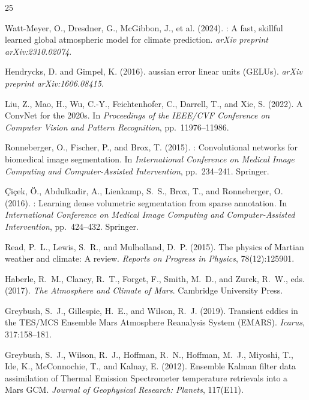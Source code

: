 \documentclass[11pt, a4paper, twocolumn]{article}
\begin{document}
\begin{thebibliography}{25}

Watt-Meyer, O., Dresdner, G., McGibbon, J., et al. (2024).
: A fast, skillful learned global atmospheric model for climate prediction.
\newblock \textit{arXiv preprint arXiv:2310.02074}.

Hendrycks, D. and Gimpel, K. (2016).
aussian error linear units ({GELUs}).
\newblock \textit{arXiv preprint arXiv:1606.08415}.

Liu, Z., Mao, H., Wu, C.-Y., Feichtenhofer, C., Darrell, T., and Xie, S. (2022).
\newblock A {ConvNet} for the 2020s.
\newblock In \textit{Proceedings of the IEEE/CVF Conference on Computer Vision and Pattern Recognition}, pp.\ 11976--11986.

Ronneberger, O., Fischer, P., and Brox, T. (2015).
: Convolutional networks for biomedical image segmentation.
\newblock In \textit{International Conference on Medical Image Computing and Computer-Assisted Intervention}, pp.\ 234--241. Springer.

\c{C}i\c{c}ek, \"{O}., Abdulkadir, A., Lienkamp, S.~S., Brox, T., and Ronneberger, O. (2016).
: Learning dense volumetric segmentation from sparse annotation.
\newblock In \textit{International Conference on Medical Image Computing and Computer-Assisted Intervention}, pp.\ 424--432. Springer.

Read, P.~L., Lewis, S.~R., and Mulholland, D.~P. (2015).
\newblock The physics of {M}artian weather and climate: A review.
\newblock \textit{Reports on Progress in Physics}, 78(12):125901.

Haberle, R.~M., Clancy, R.~T., Forget, F., Smith, M.~D., and Zurek, R.~W., eds. (2017).
\newblock \textit{The Atmosphere and Climate of Mars}.
\newblock Cambridge University Press.

Greybush, S.~J., Gillespie, H.~E., and Wilson, R.~J. (2019).
\newblock Transient eddies in the {TES/MCS} {E}nsemble {M}ars {A}tmosphere {R}eanalysis {S}ystem ({EMARS}).
\newblock \textit{Icarus}, 317:158--181.

Greybush, S.~J., Wilson, R.~J., Hoffman, R.~N., Hoffman, M.~J., Miyoshi, T., Ide, K., McConnochie, T., and Kalnay, E. (2012).
\newblock Ensemble {K}alman filter data assimilation of {T}hermal {E}mission {S}pectrometer temperature retrievals into a {M}ars {GCM}.
\newblock \textit{Journal of Geophysical Research: Planets}, 117(E11).


\end{thebibliography}
\end{document}

